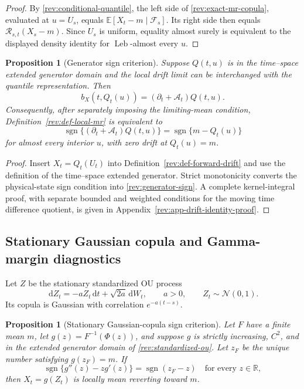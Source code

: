 \documentclass[11pt]{article}
\newtheorem{proposition}[definition]{Proposition}
\theoremstyle{remark}
\newcommand{\E}{\mathbb E}
\newcommand{\R}{\mathbb R}
\newcommand{\dd}{\,\mathrm d}
\newcommand{\sgn}{\operatorname{sgn}}
\newcommand{\Normal}{\mathcal N}
\newcommand{\Leb}{\operatorname{Leb}}
\begin{document}
\begin{proof}
By \eqref{rev:conditional-quantile}, the left side of
\eqref{rev:exact-mr-copula}, evaluated at $u=U_s$, equals
$\E[X_t-m\mid\mathcal F_s]$.  Its right side then equals
$\mathcal R_{s,t}(X_s-m)$.  Since $U_s$ is uniform, equality almost surely is
equivalent to the displayed density identity for $\Leb$-almost every $u$.
\end{proof}

\begin{proposition}[Generator sign criterion]
\label{rev:prop-generator-sign}
Suppose $Q(t,u)$ is in the time--space extended generator domain and the local
drift limit can be interchanged with the quantile representation.  Then
\begin{equation}
b_X(t,Q_t(u))=(\partial_t+\mathcal A_t)Q(t,u).
\label{rev:drift-quantile-generator}
\end{equation}
Consequently, after separately imposing the limiting-mean condition,
Definition~\ref{rev:def-local-mr} is equivalent to
\begin{equation}
\sgn\{(\partial_t+\mathcal A_t)Q(t,u)\}
=\sgn\{m-Q_t(u)\}
\label{rev:generator-sign}
\end{equation}
for almost every interior $u$, with zero drift at $Q_t(u)=m$.
\end{proposition}

\begin{proof}
Insert $X_t=Q_t(U_t)$ into Definition~\ref{rev:def-forward-drift} and use the
definition of the time--space extended generator.  Strict monotonicity converts
the physical-state sign condition into \eqref{rev:generator-sign}.
A complete kernel-integral proof, with separate bounded and weighted conditions
for the moving time difference quotient, is given in
Appendix~\ref{rev:app-drift-identity-proof}.
\end{proof}

\subsection{Stationary Gaussian copula and Gamma-margin diagnostics}

Let $Z$ be the stationary standardized OU process
\begin{equation}
\dd Z_t=-aZ_t\dd t+\sqrt{2a}\dd W_t,\qquad a>0,\qquad Z_t\sim\Normal(0,1).
\label{rev:standardized-ou}
\end{equation}
Its copula is Gaussian with correlation $e^{-a(t-s)}$.

\begin{proposition}[Stationary Gaussian-copula sign criterion]
\label{rev:prop-stationary-gaussian}
Let $F$ have a finite mean $m$, let
$g(z)=F^{-1}(\Phi(z))$, and suppose $g$ is strictly increasing,
$C^2$, and in the extended generator domain of \eqref{rev:standardized-ou}.
Let $z_F$ be the unique number satisfying $g(z_F)=m$.  If
\begin{equation}
\sgn\{g''(z)-zg'(z)\}=\sgn(z_F-z)
\quad\text{for every }z\in\R,
\label{rev:stationary-gaussian-sign}
\end{equation}
then $X_t=g(Z_t)$ is locally mean reverting toward $m$.
\end{proposition}
\end{document}
